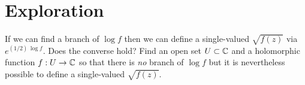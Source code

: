 \documentclass{homework}
\begin{document}
                                                                                                                                      \section{Exploration}

                                                                                                                                      \begin{problem}
                                                                                                                                        If we can find a branch of $\log f$ then we can define a
                                                                                                                                          single-valued $\sqrt{f(z)}$ via $e^{(1/2) \, \log f}$.  Does the
                                                                                                                                            converse hold?  Find an open set $U \subset \mathbb{C}$ and a holomorphic
                                                                                                                                              function $f : U \to \mathbb{C}$ so that there is \textit{no} branch of
                                                                                                                                                $\log f$ but it is nevertheless possible to define a single-valued
                                                                                                                                                  $\sqrt{f(z)}$.
                                                                                                                                                  \end{problem}
\end{document}
